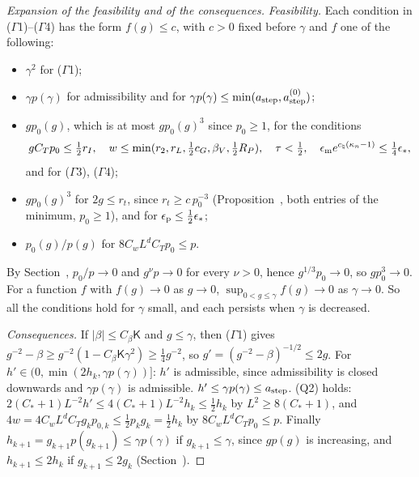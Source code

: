 \begin{proof}[Expansion of the feasibility and of the consequences]
\emph{Feasibility.} Each condition in ($\Gamma$1)--($\Gamma$4) has the form $f(g)\le c$, with $c>0$ fixed before $\gamma$ and $f$ one of the following:
\begin{itemize}
\item $\gamma^2$ for ($\Gamma$1);
\item $\gamma p(\gamma)$ for admissibility and for $\gamma p(\gamma)\le\min(a_{\rm step},a^{(0)}_{\rm step})$;
\item $gp_0(g)$, which is at most $gp_0(g)^3$ since $p_0\ge1$, for the conditions
\[
gC_Tp_0\le\tfrac12r_I,\quad w\le\min(r_2,r_L,\tfrac12c_G,\beta_V,\tfrac12R_P),\quad\tau<\tfrac12,\quad\epsilon_{\rm m}e^{c_\natural(\kappa_n-1)}\le\tfrac14\epsilon_*,
\]
and for ($\Gamma$3), ($\Gamma$4);
\item $gp_0(g)^3$ for $2g\le r_t$, since $r_t\ge c\,p_0^{-3}$ (Proposition~, both entries of the minimum, $p_0\ge1$), and for $\epsilon_{\rm p}\le\frac12\epsilon_*$;
\item $p_0(g)/p(g)$ for $8C_wL^dC_Tp_0\le p$.
\end{itemize}
By Section~, $p_0/p\to0$ and $g^\nu p\to0$ for every $\nu>0$, hence $g^{1/3}p_0\to0$, so $gp_0^3\to0$. For a function $f$ with $f(g)\to0$ as $g\to0$, $\sup_{0<g\le\gamma}f(g)\to0$ as $\gamma\to0$. So all the conditions hold for $\gamma$ small, and each persists when $\gamma$ is decreased.

\emph{Consequences.} If $|\beta|\le C_\beta\mathsf K$ and $g\le\gamma$, then ($\Gamma$1) gives $g^{-2}-\beta\ge g^{-2}(1-C_\beta\mathsf K\gamma^2)\ge\frac14g^{-2}$, so $g'=(g^{-2}-\beta)^{-1/2}\le2g$. For $h'\in(0,\min(2h_k,\gamma p(\gamma))]$: $h'$ is admissible, since admissibility is closed downwards and $\gamma p(\gamma)$ is admissible. $h'\le\gamma p(\gamma)\le a_{\rm step}$. (Q2) holds: $2(C_*+1)L^{-2}h'\le4(C_*+1)L^{-2}h_k\le\frac12h_k$ by $L^2\ge8(C_*+1)$, and $4w=4C_wL^dC_Tg_kp_{0,k}\le\frac12p_kg_k=\frac12h_k$ by $8C_wL^dC_Tp_0\le p$. Finally $h_{k+1}=g_{k+1}p(g_{k+1})\le\gamma p(\gamma)$ if $g_{k+1}\le\gamma$, since $gp(g)$ is increasing, and $h_{k+1}\le2h_k$ if $g_{k+1}\le2g_k$ (Section~).
\end{proof}

